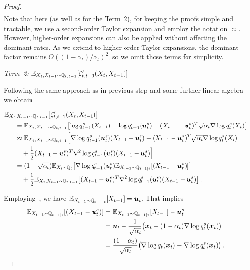 \begin{proof}
\begin{align*}
\end{align*}
Note that here (as well as for the Term~2), for keeping the proofs simple and tractable, we use a second-order Taylor expansion and employ the notation $\approx$.  However, higher-order expansions can also be applied without affecting the dominant rates. As we extend to higher-order Taylor expansions, the dominant factor remains  $O((1-\alpha_t)/\alpha_t)^2$, so we omit those terms for simplicity.  

\emph{Term~2:} $\textcolor{black}{\mathbb{E}}_{X_t,X_{t-1}\sim \mathbb{Q}_{t,t-1}}[\zeta'_{t,t-1}(X_t,X_{t-1})]$

Following the same approach as in previous step and some further linear algebra we obtain 

\begin{align*}
    &\textcolor{black}{\mathbb{E}}_{X_t,X_{t-1}\sim \mathbb{Q}_{t,t-1}}\bigl[\zeta'_{t,t-1}(X_t,X_{t-1})\bigr]\\
    &~~~~~=\textcolor{black}{\mathbb{E}}_{X_t,X_{t-1}\sim \mathbb{Q}_{t,t-1}}
    \bigl[\log q^s_{t-1}(X_{t-1})-\log q^s_{t-1}(\boldsymbol{u}^s_t)-(X_{t-1}-\boldsymbol{u}^s_{t})^T\sqrt{\alpha_t}\nabla \log q^s_t(X_{t})\bigr]\\
    &~~~~~\approx\textcolor{black}{\mathbb{E}}_{X_t,X_{t-1}\sim \mathbb{Q}_{t,t-1}}
    \Bigl[\nabla\log q^s_{t-1}(\boldsymbol{u}^s_t)(X_{t-1}-\boldsymbol{u}^s_t)-(X_{t-1}-\boldsymbol{u}^s_{t})^T\sqrt{\alpha_t}\nabla \log q^s_t(X_{t})\\
    &~~~~~~~~+\frac{1}{2}(X_{t-1}-\boldsymbol{u}^s_t)^T \nabla^2\log q^s_{t-1}(\boldsymbol{u}^s_t)(X_{t-1}-\boldsymbol{u}^s_t)\Bigr] \\
    &~~~~~= (1-\sqrt{\alpha_t})\textcolor{black}{\mathbb{E}}_{X_t\sim \mathbb{Q}_{t}}
    \bigl[\nabla\log q^s_{t-1}(\boldsymbol{u}^s_t)\textcolor{black}{\mathbb{E}}_{X_{t-1}\sim \mathbb{Q}_{t-1|t}}[(X_{t-1}-\boldsymbol{u}^s_t)]\bigr]\\
    &~~~~~~~~+\frac{1}{2}\textcolor{black}{\mathbb{E}}_{X_t,X_{t-1}\sim \mathbb{Q}_{t,t-1}}
    \bigl[(X_{t-1}-\boldsymbol{u}^s_t)^T \nabla^2\log q^s_{t-1}(\boldsymbol{u}^s_t)(X_{t-1}-\boldsymbol{u}^s_t)\bigr]\,.
\end{align*}



Employing~\citet[Lemma~8; first claim]{liang2024nonN},  we have $\textcolor{black}{\mathbb{E}}_{X_{t-1}\sim \mathbb{Q}_{t-1|t}}[X_{t-1}]=\boldsymbol{u}_t$.
That implies
\begin{align*}
    \textcolor{black}{\mathbb{E}}_{X_{t-1}\sim \mathbb{Q}_{t-1|t}}[(X_{t-1}-\boldsymbol{u}^s_t)]
    &=\textcolor{black}{\mathbb{E}}_{X_{t-1}\sim \mathbb{Q}_{t-1|t}}[X_{t-1}]-\boldsymbol{u}^s_t\\
    &=\boldsymbol{u}_t-\frac{1}{\sqrt{\alpha_t}}\bigl(\textcolor{black}{\boldsymbol{x}}_t+(1-\alpha_t)\nabla\log q^s_t(\textcolor{black}{\boldsymbol{x}}_t)\bigr)\\
    &=\frac{(1-\alpha_t)}{\sqrt{\alpha_t}}\bigl(\nabla\log q_t(\textcolor{black}{\boldsymbol{x}}_t)-\nabla\log q^s_t(\textcolor{black}{\boldsymbol{x}}_t)\bigr)\,.
\end{align*}


\end{proof}
